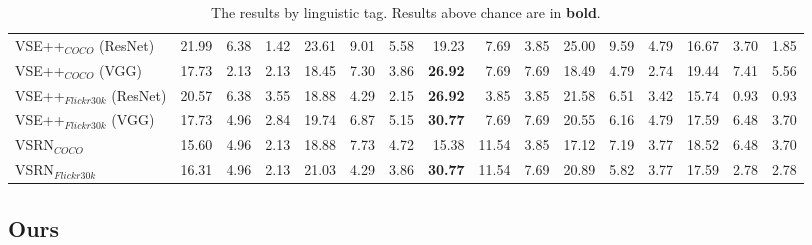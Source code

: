 \begin{table*}[!ht]
\begin{adjustbox}{max width=\textwidth}
\begin{tabular}{l|rrr|rrr|rrr|rrr|rrr}
 VSE++$_{COCO}$ (ResNet)      & 21.99          & 6.38           & 1.42           & 23.61          & 9.01           & 5.58           & 19.23          & 7.69           & 3.85           & 25.00          & 9.59           & 4.79           & 16.67          & 3.70           & 1.85           \\
 VSE++$_{COCO}$ (VGG)         & 17.73          & 2.13           & 2.13           & 18.45          & 7.30           & 3.86           & \textbf{26.92} & 7.69           & 7.69           & 18.49          & 4.79           & 2.74           & 19.44          & 7.41           & 5.56           \\
 VSE++$_{Flickr30k}$ (ResNet) & 20.57          & 6.38           & 3.55           & 18.88          & 4.29           & 2.15           & \textbf{26.92} & 3.85           & 3.85           & 21.58          & 6.51           & 3.42           & 15.74          & 0.93           & 0.93           \\
 VSE++$_{Flickr30k}$ (VGG)    & 17.73          & 4.96           & 2.84           & 19.74          & 6.87           & 5.15           & \textbf{30.77} & 7.69           & 7.69           & 20.55          & 6.16           & 4.79           & 17.59          & 6.48           & 3.70           \\
 VSRN$_{COCO}$                & 15.60          & 4.96           & 2.13           & 18.88          & 7.73           & 4.72           & 15.38          & 11.54          & 3.85           & 17.12          & 7.19           & 3.77           & 18.52          & 6.48           & 3.70           \\
 VSRN$_{Flickr30k}$           & 16.31          & 4.96           & 2.13           & 21.03          & 4.29           & 3.86           & \textbf{30.77} & 11.54          & 7.69           & 20.89          & 5.82           & 3.77           & 17.59          & 2.78           & 2.78           \\
          \bottomrule
  \end{tabular}
  \end{adjustbox}
  \caption{The results by linguistic tag. Results above chance are in \textbf{bold}.}
    \label{tab:results-by-ling-tag-baseline}
\end{table*}

\subsection{Ours}

